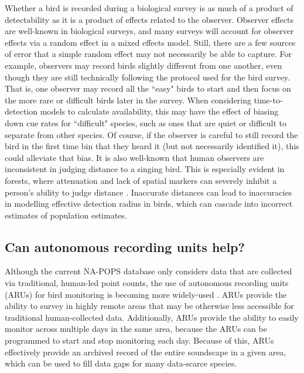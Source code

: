 \par Whether a bird is recorded during a biological survey is as much of a product of detectability as it is a product of effects related to the observer.
Observer effects are well-known in biological surveys, and many surveys will account for observer effects via a random effect in a mixed effects model.
Still, there are a few sources of error that a simple random effect may not necessarily be able to capture.
For example, observers may record birds slightly different from one another, even though they are still technically following the protocol used for the bird survey.
That is, one observer may record all the ``easy" birds to start and then focus on the more rare or difficult birds later in the survey.
When considering time-to-detection models to calculate availability, this may have the effect of biasing down cue rates for ``difficult" species, such as ones that are quiet or difficult to separate from other species.
Of course, if the observer is careful to still record the bird in the first time bin that they heard it (but not necessarily identified it), this could alleviate that bias.
It is also well-known that human observers are inconsistent in judging distance to a singing bird.
This is especially evident in forests, where attenuation and lack of spatial markers can severely inhibit a person's ability to judge distance \citep{alldredge_field_2007}.
Inaccurate distances can lead to inaccuracies in modelling effective detection radius in birds, which can cascade into incorrect estimates of population estimates.

\subsection{Can autonomous recording units help?}

\par Although the current NA-POPS database only considers data that are collected via traditional, human-led point counts, the use of autonomous recording units (ARUs) for bird monitoring is becoming more widely-used \citep{perezgranados_estimating_2021, shonfield_autonomous_2017, sugai_terrestrial_2019}.
ARUs provide the ability to survey in highly remote areas that may be otherwise less accessible for traditional human-collected data.
Additionally, ARUs provide the ability to easily monitor across multiple days in the same area, because the ARUs can be programmed to start and stop monitoring each day.
Because of this, ARUs effectively provide an archived record of the entire soundscape in a given area, which can be used to fill data gaps for many data-scarce species.

